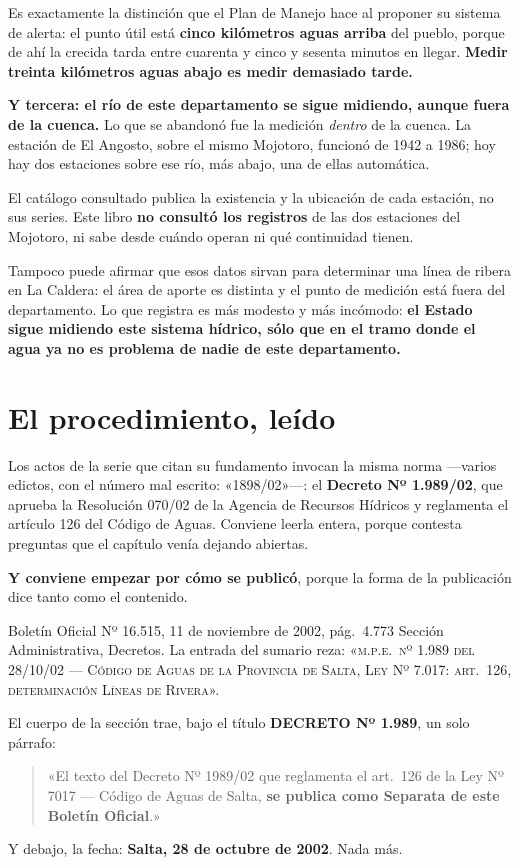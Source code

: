 Es exactamente la distinción que el Plan de Manejo hace al proponer su sistema de alerta:
el punto útil está \textbf{cinco kilómetros aguas arriba} del pueblo, porque de ahí la
crecida tarda entre cuarenta y cinco y sesenta minutos en llegar. \textbf{Medir treinta
kilómetros aguas abajo es medir demasiado tarde.}

\textbf{Y tercera: el río de este departamento se sigue midiendo, aunque fuera de la cuenca.} Lo que se
abandonó fue la medición \textit{dentro} de la cuenca. La estación de El Angosto, sobre el
mismo Mojotoro, funcionó de 1942 a 1986; hoy hay dos estaciones sobre ese río, más abajo, una
de ellas automática.

\begin{cautela}
El catálogo consultado publica la existencia y la ubicación de cada estación, no sus series.
Este libro \textbf{no consultó los registros} de las dos estaciones del Mojotoro, ni sabe
desde cuándo operan ni qué continuidad tienen.

Tampoco puede afirmar que esos datos sirvan para determinar una línea de ribera en La Caldera:
el área de aporte es distinta y el punto de medición está fuera del departamento. Lo que
registra es más modesto y más incómodo: \textbf{el Estado sigue midiendo este sistema hídrico,
sólo que en el tramo donde el agua ya no es problema de nadie de este departamento.}
\end{cautela}

\section{El procedimiento, leído}

Los actos de la serie que citan su fundamento invocan la misma norma ---varios edictos, con el número mal escrito: «1898/02»---: el \textbf{Decreto
Nº 1.989/02}, que aprueba la Resolución 070/02 de la Agencia de Recursos Hídricos y reglamenta
el artículo 126 del Código de Aguas. Conviene
leerla entera, porque contesta preguntas que el capítulo venía
dejando abiertas.

\textbf{Y conviene empezar por cómo se publicó}, porque la forma de la publicación dice tanto
como el contenido.

\begin{ficha}{Boletín Oficial Nº 16.515, 11 de noviembre de 2002, pág.\ 4.773}
Sección Administrativa, Decretos. La entrada del sumario reza: «\textsc{m.p.e.\ n\textup{º} 1.989 del
28/10/02 --- Código de Aguas de la Provincia de Salta, Ley N\textup{º} 7.017: art.\ 126, determinación
Líneas de Rivera}».

El cuerpo de la sección trae, bajo el título \textbf{DECRETO Nº 1.989}, un solo párrafo:

\begin{quote}
«El texto del Decreto Nº 1989/02 que reglamenta el art.\ 126 de la Ley Nº 7017 --- Código de
Aguas de Salta, \textbf{se publica como Separata de este Boletín Oficial}.»
\end{quote}

Y debajo, la fecha: \textbf{Salta, 28 de octubre de 2002}. Nada más.
\end{ficha}

